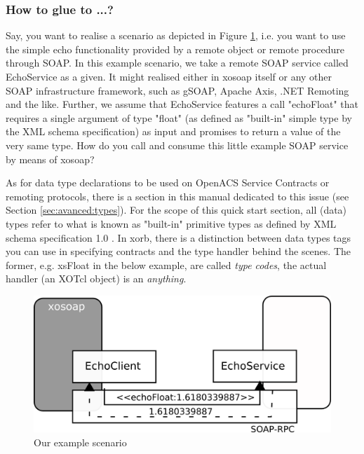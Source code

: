   \subsubsection{How to glue to ...?}\label{sec:xosoap:quickstart:glueto}
  Say, you want to realise a scenario as depicted in Figure \ref{fig:quickstart:xosoap:1}, i.e. you want to 
use the simple echo functionality provided by a remote object or remote procedure through SOAP. In this 
example scenario, we take a remote SOAP service called EchoService as a given. It might realised 
either in xosoap itself or any other SOAP infrastructure framework, such as gSOAP, Apache Axis, .NET 
Remoting and the like. Further, we assume that  EchoService features a call "echoFloat" that requires a 
single argument of type "float" (as defined as "built-in" simple type by the XML schema specification) as 
input and promises to return a value of the very same type. How do you call and consume this little 
example SOAP service by means of xosoap?
\begin{hints}
\item As for data type declarations to be used on OpenACS Service Contracts or remoting protocols, there is a section in this manual dedicated to this issue (see Section \ref{sec:avanced:types}). For the scope of this quick start section, all (data) types refer to what is known as "built-in" primitive types as defined by  XML schema specification 1.0 \cite{w3c:2004}. In xorb, there is a distinction between data types tags you can use in specifying contracts and the type handler behind the scenes. The former, e.g. xsFloat in the below example, are called \emph{type codes}, the actual handler  (an XOTcl object) is an \emph{anything}.
\end{hints}
\begin{figure}[htbp]
\begin{center}
\includegraphics[scale=0.5]{img/consumer.png}
\caption{Our example scenario}
\label{fig:quickstart:xosoap:1}
\end{center}
\end{figure}
